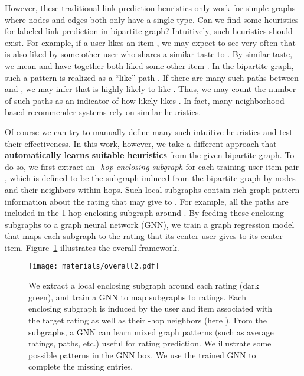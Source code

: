 \documentclass{article} \usepackage{iclr2020_conference,times}
\begin{document}
However, these traditional link prediction heuristics only work for simple graphs where nodes and edges both only have a single type. Can we find some heuristics for labeled link prediction in bipartite graph?
Intuitively, such heuristics should exist. For example, if a user  likes an item , we may expect to see very often that  is also liked by some other user  who shares a similar taste to . By similar taste, we mean  and  have together both liked some other item . In the bipartite graph, such a pattern is realized as a ``like'' path . If there are many such paths between  and , we may infer that  is highly likely to like . Thus, we may count the number of such paths as an indicator of how likely  likes . In fact, many neighborhood-based recommender systems \citep{desrosiers2011comprehensive} rely on similar heuristics. 



Of course we can try to manually define many such intuitive heuristics and test their effectiveness. In this work, however, we take a different approach that \textbf{automatically learns suitable heuristics} from the given bipartite graph. To do so, we first extract an \textit{-hop enclosing subgraph} for each training user-item pair , which is defined to be the subgraph induced from the bipartite graph by nodes  and their neighbors within  hops. Such local subgraphs contain rich graph pattern information about the rating that  may give to . For example, all the  paths are included in the 1-hop enclosing subgraph around . By feeding these enclosing subgraphs to a graph neural network (GNN), we train a graph regression model that maps each subgraph to the rating that its center user gives to its center item. Figure~\ref{overall} illustrates the overall framework. 


\begin{figure}
\centering
  \texttt{[image: materials/overall2.pdf]}
  \caption{We extract a local enclosing subgraph around each rating (dark green), and train a GNN to map subgraphs to ratings. Each enclosing subgraph is induced by the user and item associated with the target rating as well as their -hop neighbors (here ).
From the subgraphs, a GNN can learn mixed graph patterns (such as average ratings, paths, etc.) useful for rating prediction. We illustrate some possible patterns in the GNN box.
We use the trained GNN to complete the missing entries.}
  \label{overall}
\end{figure}
\end{document}
